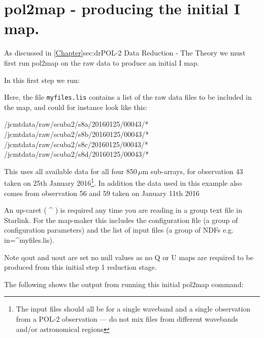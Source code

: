 \section{pol2map - producing the initial I map.}

As discussed in \cref{Chapter}{sec:dr}{POL-2 Data Reduction - The Theory} we must first run pol2map on the raw data to produce an initial I map.

In this first step we run:

\begin{terminalv}
\end{terminalv}


Here, the file \texttt{myfiles.lis} contains a list of the raw data
files to be included in the map, and could for instance look like this:

\begin{terminalv}
/jcmtdata/raw/scuba2/s8a/20160125/00043/*
/jcmtdata/raw/scuba2/s8b/20160125/00043/*
/jcmtdata/raw/scuba2/s8c/20160125/00043/*
/jcmtdata/raw/scuba2/s8d/20160125/00043/*
\end{terminalv}

This uses all available data for all four 850\,$\mu$m sub-arrays, for
observation 43 taken on 25th January 2016\footnote{The input files should all be
for a single waveband and a single observation from a POL-2 observation --- do not mix files from
different wavebands and/or astronomical regions}. In addition the data used in this example also
comes from observation 56 and 59 taken on January 11th 2016

\begin{tip}
An up-caret ( ^ ) is required any time you are reading in a group text file in Starlink. For the map-maker this includes the configuration file (a group of configuration parameters) and the list of input files (a group of NDFs e.g. in=^myfiles.lis). 
\end{tip}

Note qout and uout are set no null values as no Q or U maps are required to be produced from this initial step 1 reduction stage.

The following shows the output from running this initial pol2map command:


